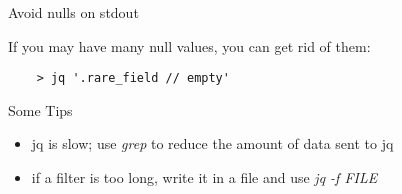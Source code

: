 \documentclass{beamer}
\renewcommand\big[1]{
  \begin{center}
    \Large{#1}
  \end{center}
}
\begin{document}
\begin{frame}[fragile]
  \big{Avoid nulls on stdout}

  If you may have many null values, you can get rid of them:

  \begin{lstlisting}
    > jq '.rare_field // empty'
  \end{lstlisting}
\end{frame}

\begin{frame}
  \big{Some Tips}

  \begin{itemize}
    \item jq is slow; use \textit{grep} to reduce the amount of data sent to jq
    \item if a filter is too long, write it in a file and use \textit{jq -f FILE}
  \end{itemize}
\end{frame}
\end{document}
